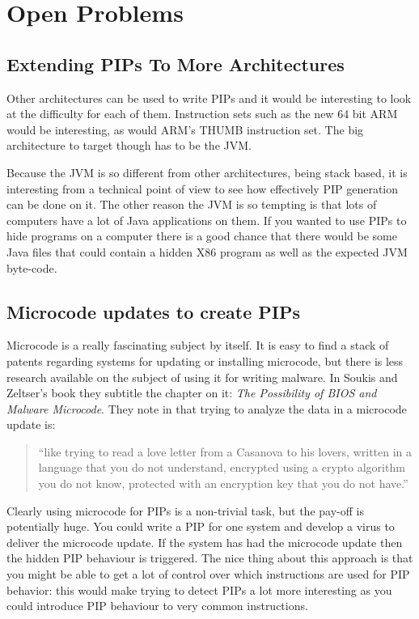 \documentclass[10pt,]{book}
\begin{document}
\section{Open Problems}

\subsection{Extending PIPs To More Architectures}

Other architectures can be used to write PIPs and it would be
interesting to look at the difficulty for each of them. Instruction sets
such as the new 64 bit ARM would be interesting, as would ARM's THUMB
instruction set. The big architecture to target though has to be the
JVM.

Because the JVM is so different from other architectures, being stack
based, it is interesting from a technical point of view to see how
effectively PIP generation can be done on it. The other reason the JVM
is so tempting is that lots of computers have a lot of Java applications
on them. If you wanted to use PIPs to hide programs on a computer there
is a good chance that there would be some Java files that could contain
a hidden X86 program as well as the expected JVM byte-code.

\subsection{Microcode updates to create PIPs}

Microcode is a really fascinating subject by itself. It is easy to find
a stack of patents regarding systems for updating or installing
microcode\autocite{Demke:2000uf}\autocite{Tung:2004tm}\autocite{Langford:2006uf},
but there is less research available on the subject of using it for
writing malware. In Soukis and Zeltser's book \autocite{Skoudis:2004to}
they subtitle the chapter on it: \emph{The Possibility of BIOS and
Malware Microcode}. They note in \autocite{Skoudis:2004to} that trying
to analyze the data in a microcode update is:

\begin{quote}
``like trying to read a love letter from a Casanova to his lovers,
written in a language that you do not understand, encrypted using a
crypto algorithm you do not know, protected with an encryption key that
you do not have.''

\end{quote}
Clearly using microcode for PIPs is a non-trivial task, but the pay-off
is potentially huge. You could write a PIP for one system and develop a
virus to deliver the microcode update. If the system has had the
microcode update then the hidden PIP behaviour is triggered. The nice
thing about this approach is that you might be able to get a lot of
control over which instructions are used for PIP behavior: this would
make trying to detect PIPs a lot more interesting as you could introduce
PIP behaviour to very common instructions.
\end{document}
